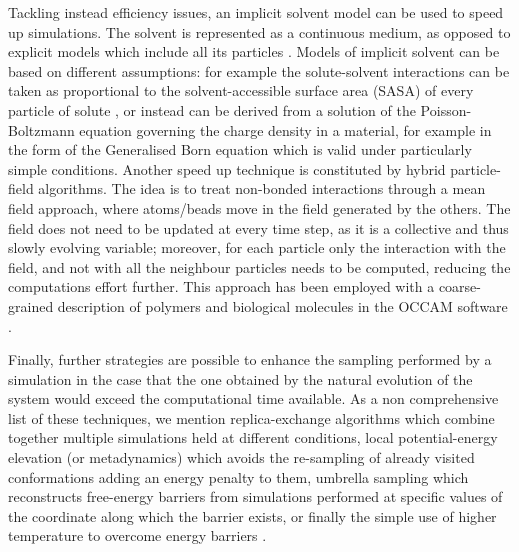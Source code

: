 \documentclass[graybox]{svmult}
\begin{document}
Tackling instead efficiency issues, an implicit solvent model can be used to speed up simulations. The solvent is represented as a continuous medium, as opposed to explicit models which include all its particles \cite{Kleinjung2014}.
%
Models of implicit solvent can be based on different assumptions: for example the solute-solvent interactions can be taken as proportional to the solvent-accessible surface area (SASA) of every particle of solute \cite{Fraternali1996,Kleinjung2003,Kleinjung2012,Fornili2012}, or instead can be derived from a solution of the Poisson-Boltzmann equation governing the charge density in a material, for example in the form of the Generalised Born equation \cite{Zhu2005} which is valid under particularly simple conditions.
%
Another speed up technique is constituted by hybrid particle-field algorithms. The idea is to treat non-bonded interactions through a mean field approach, where atoms/beads move in the field generated by the others. The field does not need to be updated at every time step, as it is a collective and thus slowly evolving variable; moreover, for each particle only the interaction with the field, and not with all the neighbour particles needs to be computed, reducing the computations effort further. This approach has been employed with a coarse-grained description of polymers and biological molecules in the OCCAM software \cite{Milano2009}.

Finally, further strategies are possible to enhance the sampling performed by a simulation in the case that the one obtained by the natural evolution of the system would exceed the computational time available. As a non comprehensive list of these techniques, we mention replica-exchange algorithms \cite{Okamoto2004} which combine together multiple simulations held at different conditions, local potential-energy elevation (or metadynamics) \cite{Huber1994,Laio2002} which avoids the re-sampling of already visited conformations adding an energy penalty to them, umbrella sampling \cite{Torrie1977} which reconstructs free-energy barriers from simulations performed at specific values of the coordinate along which the barrier exists, or finally the simple use of higher temperature to overcome energy barriers \cite{Kirkpatrick1983}.
\end{document}
